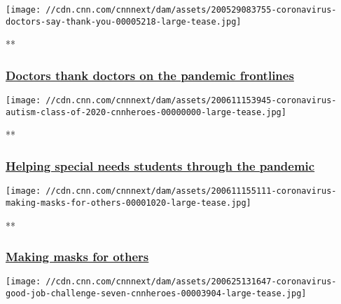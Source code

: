 \href{/videos/tv/2020/05/29/coronavirus-doctors-say-thank-you.cnn}{}

\texttt{[image: //cdn.cnn.com/cnnnext/dam/assets/200529083755-coronavirus-doctors-say-thank-you-00005218-large-tease.jpg]}

**

\hypertarget{doctors-thank-doctors-on-the-pandemic-frontlines}{%
\subsubsection{\texorpdfstring{\href{/videos/tv/2020/05/29/coronavirus-doctors-say-thank-you.cnn}{Doctors
thank doctors on the pandemic
frontlines}}{Doctors thank doctors on the pandemic frontlines}}\label{doctors-thank-doctors-on-the-pandemic-frontlines}}

\href{/videos/tv/2020/06/11/coronavirus-autism-class-of-2020-cnnheroes.cnn}{}

\texttt{[image: //cdn.cnn.com/cnnnext/dam/assets/200611153945-coronavirus-autism-class-of-2020-cnnheroes-00000000-large-tease.jpg]}

**

\hypertarget{helping-special-needs-students-through-the-pandemic}{%
\subsubsection{\texorpdfstring{\href{/videos/tv/2020/06/11/coronavirus-autism-class-of-2020-cnnheroes.cnn}{Helping
special needs students through the
pandemic}}{Helping special needs students through the pandemic}}\label{helping-special-needs-students-through-the-pandemic}}

\href{/videos/tv/2020/06/11/coronavirus-making-masks-for-others.cnn}{}

\texttt{[image: //cdn.cnn.com/cnnnext/dam/assets/200611155111-coronavirus-making-masks-for-others-00001020-large-tease.jpg]}

**

\hypertarget{making-masks-for-others}{%
\subsubsection{\texorpdfstring{\href{/videos/tv/2020/06/11/coronavirus-making-masks-for-others.cnn}{Making
masks for
others}}{Making masks for others}}\label{making-masks-for-others}}

\href{/videos/tv/2020/06/25/coronavirus-good-job-challenge-seven-cnnheroes.cnn}{}

\texttt{[image: //cdn.cnn.com/cnnnext/dam/assets/200625131647-coronavirus-good-job-challenge-seven-cnnheroes-00003904-large-tease.jpg]}

